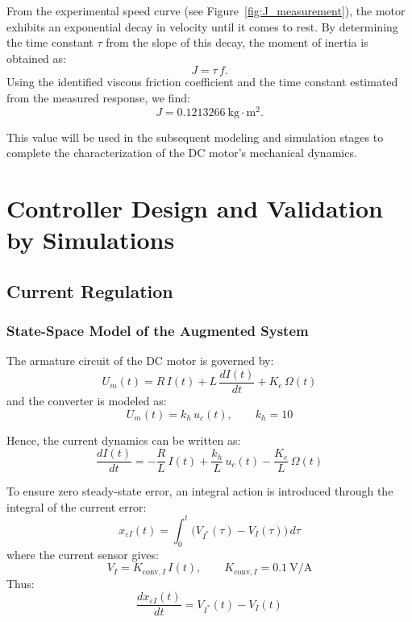 \documentclass{rapportCS}
\begin{document}
From the experimental speed curve (see Figure~\ref{fig:J_measurement}), the motor exhibits an exponential decay in velocity until it comes to rest. By determining the time constant $\tau$ from the slope of this decay, the moment of inertia is obtained as:
\[
J = \tau\,f.
\]
Using the identified viscous friction coefficient and the time constant estimated from the measured response, we find:
\[
\boxed{J = 0.1213266~\mathrm{kg\cdot m^2}}.
\]

This value will be used in the subsequent modeling and simulation stages to complete the characterization of the DC motor’s mechanical dynamics.



\newpage

\section{Controller Design and Validation by Simulations}

\subsection{Current Regulation}
\subsubsection{State-Space Model of the Augmented System}

The armature circuit of the DC motor is governed by:
\begin{equation*}
U_m(t) = R\,I(t) + L\,\frac{dI(t)}{dt} + K_e\,\Omega(t)
\end{equation*}
and the converter is modeled as:
\begin{equation*}
U_m(t) = k_h\,u_c(t), \qquad k_h = 10
\end{equation*}

Hence, the current dynamics can be written as:
\begin{equation*}
\frac{dI(t)}{dt} = -\frac{R}{L}\,I(t) + \frac{k_h}{L}\,u_c(t) - \frac{K_e}{L}\,\Omega(t)
\end{equation*}

To ensure zero steady-state error, an integral action is introduced through the integral of the current error:
\begin{equation*}
x_{\varepsilon I}(t) = \int_0^t \big(V_{I^*}(\tau) - V_I(\tau)\big)\,d\tau
\end{equation*}
where the current sensor gives:
\begin{equation*}
V_I = K_{\mathrm{conv},I}\,I(t), \qquad K_{\mathrm{conv},I} = 0.1~\text{V/A}
\end{equation*}
Thus:
\begin{equation*}
\frac{dx_{\varepsilon I}(t)}{dt} = V_{I^*}(t) - V_I(t)
\end{equation*}
\end{document}
